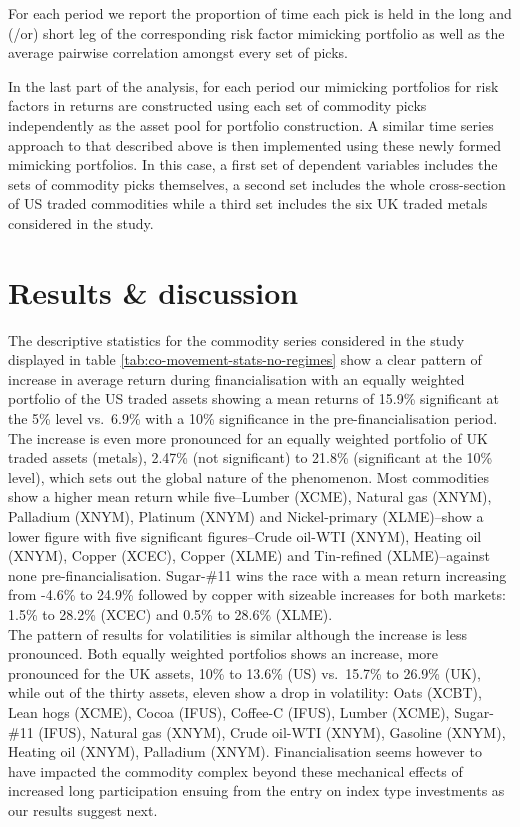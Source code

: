 \documentclass[]{elsarticle} %
\begin{document}
\medskip\setlength{\parindent}{0pt}

For each period we report the proportion of time each pick is held in the long and (/or) short leg of the corresponding risk factor mimicking portfolio as well as the average pairwise correlation amongst every set of picks.

\medskip\setlength{\parindent}{0pt}

In the last part of the analysis, for each period our mimicking portfolios for risk factors in returns are constructed using each set of commodity picks independently as the asset pool for portfolio construction. A similar time series approach to that described above is then implemented using these newly formed mimicking portfolios. In this case, a first set of dependent variables includes the sets of commodity picks themselves, a second set includes the whole cross-section of US traded commodities while a third set includes the six UK traded metals considered in the study.

\newpage

\hypertarget{co-movement-results}{%
\section{Results \& discussion}\label{co-movement-results}}

The descriptive statistics for the commodity series considered in the study displayed in table \ref{tab:co-movement-stats-no-regimes} show a clear pattern of increase in average return during financialisation with an equally weighted portfolio of the US traded assets showing a mean returns of 15.9\% significant at the 5\% level vs.~6.9\% with a 10\% significance in the pre-financialisation period. The increase is even more pronounced for an equally weighted portfolio of UK traded assets (metals), 2.47\% (not significant) to 21.8\% (significant at the 10\% level), which sets out the global nature of the phenomenon. Most commodities show a higher mean return while five--Lumber (XCME), Natural gas (XNYM), Palladium (XNYM), Platinum (XNYM) and Nickel-primary (XLME)--show a lower figure with five significant figures--Crude oil-WTI (XNYM), Heating oil (XNYM), Copper (XCEC), Copper (XLME) and Tin-refined (XLME)--against none pre-financialisation. Sugar-\#11 wins the race with a mean return increasing from -4.6\% to 24.9\% followed by copper with sizeable increases for both markets: 1.5\% to 28.2\% (XCEC) and 0.5\% to 28.6\% (XLME).\\
The pattern of results for volatilities is similar although the increase is less pronounced. Both equally weighted portfolios shows an increase, more pronounced for the UK assets, 10\% to 13.6\% (US) vs.~15.7\% to 26.9\% (UK), while out of the thirty assets, eleven show a drop in volatility: Oats (XCBT), Lean hogs (XCME), Cocoa (IFUS), Coffee-C (IFUS), Lumber (XCME), Sugar-\#11 (IFUS), Natural gas (XNYM), Crude oil-WTI (XNYM), Gasoline (XNYM), Heating oil (XNYM), Palladium (XNYM). Financialisation seems however to have impacted the commodity complex beyond these mechanical effects of increased long participation ensuing from the entry on index type investments as our results suggest next.
\end{document}
